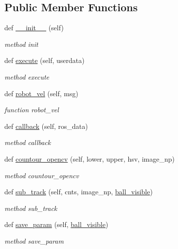 \subsection*{Public Member Functions}
\begin{DoxyCompactItemize}
\item 
def \hyperlink{classstate__machine_1_1Normal_acdbc35a37d0350d7805a628048bc3bed}{\+\_\+\+\_\+init\+\_\+\+\_\+} (self)
\begin{DoxyCompactList}\small\item\em method init \end{DoxyCompactList}\item 
def \hyperlink{classstate__machine_1_1Normal_a2930df5f4890ec4b47b2a8e18f9bff08}{execute} (self, userdata)
\begin{DoxyCompactList}\small\item\em method execute \end{DoxyCompactList}\item 
def \hyperlink{classstate__machine_1_1Normal_a9e1b8d69a0e55eff3518dae91a81626a}{robot\+\_\+vel} (self, msg)
\begin{DoxyCompactList}\small\item\em function robot\+\_\+vel \end{DoxyCompactList}\item 
def \hyperlink{classstate__machine_1_1Normal_ab8bc608e9dab104a02f5ef47b4420aa3}{callback} (self, ros\+\_\+data)
\begin{DoxyCompactList}\small\item\em method callback \end{DoxyCompactList}\item 
def \hyperlink{classstate__machine_1_1Normal_ae850fe2a131b73c9b558780700411e98}{countour\+\_\+opencv} (self, lower, upper, hsv, image\+\_\+np)
\begin{DoxyCompactList}\small\item\em method countour\+\_\+opencv \end{DoxyCompactList}\item 
def \hyperlink{classstate__machine_1_1Normal_a2bcff58a537d46bdb548c4fa3eb1f2c8}{sub\+\_\+track} (self, cnts, image\+\_\+np, \hyperlink{classstate__machine_1_1Normal_aa7f6732a154ed8e53353598c2278cd49}{ball\+\_\+visible})
\begin{DoxyCompactList}\small\item\em method sub\+\_\+track \end{DoxyCompactList}\item 
def \hyperlink{classstate__machine_1_1Normal_a00b62ef4a75771f3a13cbc8c0a3e0387}{save\+\_\+param} (self, \hyperlink{classstate__machine_1_1Normal_aa7f6732a154ed8e53353598c2278cd49}{ball\+\_\+visible})
\begin{DoxyCompactList}\small\item\em method save\+\_\+param \end{DoxyCompactList}\end{DoxyCompactItemize}
